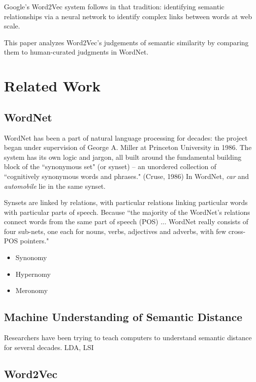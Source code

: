 \documentclass{article}
\begin{document}
Google's Word2Vec system follows in that tradition: identifying semantic relationships via a neural network to identify complex links between words at web scale.\cite{Word2Vec}

This paper analyzes Word2Vec's judgements of semantic similarity by comparing them to human-curated judgments in WordNet. 

\section{Related Work}

\subsection{WordNet}  \label{WordNet}
WordNet has been a part of natural language processing for decades: the project began under supervision of George A. Miller at Princeton University in 1986. The system has its own logic and jargon, all built around the fundamental building block of the ``synonymous set" (or synset) \cite{wordnet} -- an unordered collection of ``cognitively synonymous words and phrases." (Cruse, 1986) In WordNet, \textit{car} and \textit{automobile} lie in the same synset.

Synsets are linked by relations, with particular relations linking particular words with particular parts of speech. Because ``the majority of the WordNet’s relations connect words from the same part of speech (POS) ... WordNet really consists of four sub-nets, one each for nouns, verbs, adjectives and adverbs, with few cross-POS pointers." \cite{Wordnetwebsite}

\begin{itemize}

  \item Synonomy
  \item Hypernomy
  \item Meronomy

\end{itemize}

\subsection{Machine Understanding of Semantic Distance}
Researchers have been trying to teach computers to understand semantic distance for several decades. LDA, LSI

\subsection{Word2Vec}
\end{document}
